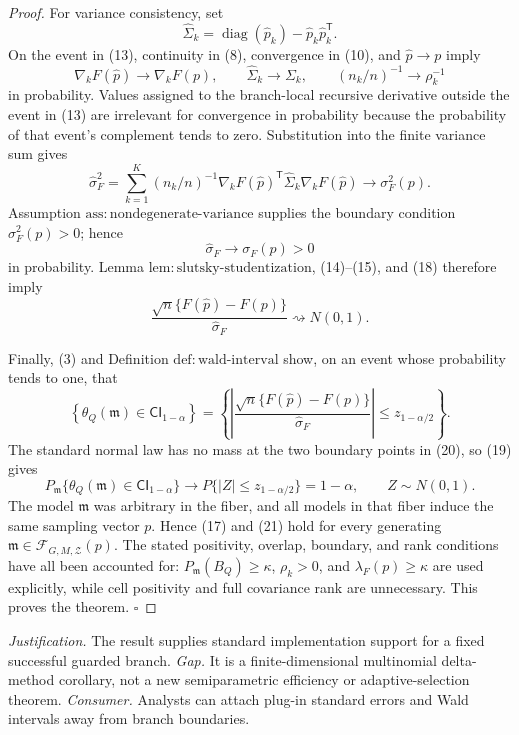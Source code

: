 \documentclass{article}
\begin{document}
\begin{proof}
For variance consistency, set
\[
 \widehat\Sigma_k
 =\operatorname{diag}(\widehat p_k)
  -\widehat p_k\widehat p_k^{\mathsf T}.
\]
On the event in (13), continuity in (8), convergence in (10), and \(\widehat p\to p\) imply
\[
 \nabla_kF(\widehat p)\to\nabla_kF(p),
 \qquad
 \widehat\Sigma_k\to\Sigma_k,
 \qquad
 (n_k/n)^{-1}\to\rho_k^{-1} \tag{16}
\]
in probability.  Values assigned to the branch-local recursive derivative outside the event in (13) are irrelevant for convergence in probability because the probability of that event's complement tends to zero.  Substitution into the finite variance sum gives
\[
 \widehat\sigma_F^2
 =\sum_{k=1}^{K}(n_k/n)^{-1}
   \nabla_kF(\widehat p)^{\mathsf T}
   \widehat\Sigma_k
   \nabla_kF(\widehat p)
 \longrightarrow\sigma_F^2(p). \tag{17}
\]
Assumption \(\mathrm{ass:nondegenerate\text{-}variance}\) supplies the boundary condition \(\sigma_F^2(p)>0\); hence
\[
 \widehat\sigma_F\longrightarrow\sigma_F(p)>0 \tag{18}
\]
in probability.  Lemma \(\mathrm{lem:slutsky\text{-}studentization}\), (14)--(15), and (18) therefore imply
\[
 \frac{\sqrt n\{F(\widehat p)-F(p)\}}
      {\widehat\sigma_F}
 \rightsquigarrow N(0,1). \tag{19}
\]

Finally, (3) and Definition \(\mathrm{def:wald\text{-}interval}\) show, on an event whose probability tends to one, that
\[
 \left\{\theta_Q(\mathfrak m)\in\mathsf{CI}_{1-\alpha}\right\}
 =
 \left\{
 \left|
 \frac{\sqrt n\{F(\widehat p)-F(p)\}}
      {\widehat\sigma_F}
 \right|
 \leq z_{1-\alpha/2}
 \right\}. \tag{20}
\]
The standard normal law has no mass at the two boundary points in (20), so (19) gives
\[
 P_{\mathfrak m}\{\theta_Q(\mathfrak m)\in\mathsf{CI}_{1-\alpha}\}
 \longrightarrow
 P\{|Z|\leq z_{1-\alpha/2}\}
 =1-\alpha,
 \qquad Z\sim N(0,1). \tag{21}
\]
The model \(\mathfrak m\) was arbitrary in the fiber, and all models in that fiber induce the same sampling vector \(p\).  Hence (17) and (21) hold for every generating \(\mathfrak m\in\mathcal F_{G,M,\mathcal Z}(p)\).  The stated positivity, overlap, boundary, and rank conditions have all been accounted for: \(P_{\mathfrak m}(B_Q)\geq\kappa\), \(\rho_k>0\), and \(\lambda_F(p)\geq\kappa\) are used explicitly, while cell positivity and full covariance rank are unnecessary.  This proves the theorem. \(\square\)
\end{proof}
\par\smallskip\noindent \textit{Justification.} The result supplies standard implementation support for a fixed successful guarded branch. \textit{Gap.} It is a finite-dimensional multinomial delta-method corollary, not a new semiparametric efficiency or adaptive-selection theorem. \textit{Consumer.} Analysts can attach plug-in standard errors and Wald intervals away from branch boundaries.
\end{document}
